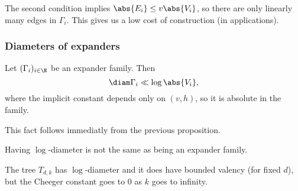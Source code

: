 \begin{remark}
    The second condition implies $\abs{E_i} \le v \abs{V_i}$, 
    so there are only linearly many edges in $\Gamma_i$. 
    This gives us a low cost of construction (in applications).
\end{remark}

\subsubsection*{Diameters of expanders}

Let $(\Gamma_i)_{i \in \N}$ be an expander family. Then
\[
    \diam \Gamma_i \ll \log\abs{V_i},
\]
where the implicit constant depends only on $(v, h)$, 
so it is absolute in the family.


This fact follows immediatly from the previous proposition.

\begin{remark}
    Having $\log$-diameter is not the same as being
    an expander family.
\end{remark}

\begin{example}
    The tree $T_{d,k}$ has $\log$-diameter and it 
    does have bounded valency (for fixed $d$), but 
    the Cheeger constant goes to $0$ as $k$ goes 
    to infinity.
\end{example}

